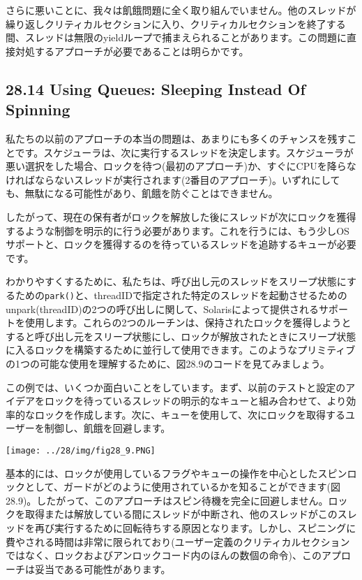 さらに悪いことに、我々は飢餓問題に全く取り組んでいません。他のスレッドが繰り返しクリティカルセクションに入り、クリティカルセクションを終了する間、スレッドは無限のyieldループで捕まえられることがあります。この問題に直接対処するアプローチが必要であることは明らかです。

\hypertarget{using-queues-sleeping-instead-of-spinning}{%
\subsection*{28.14 Using Queues: Sleeping Instead Of
Spinning}\label{using-queues-sleeping-instead-of-spinning}}

私たちの以前のアプローチの本当の問題は、あまりにも多くのチャンスを残すことです。スケジューラは、次に実行するスレッドを決定します。スケジューラが悪い選択をした場合、ロックを待つ(最初のアプローチ)か、すぐにCPUを降らなければならないスレッドが実行されます(2番目のアプローチ)。いずれにしても、無駄になる可能性があり、飢餓を防ぐことはできません。

したがって、現在の保有者がロックを解放した後にスレッドが次にロックを獲得するような制御を明示的に行う必要があります。これを行うには、もう少しOSサポートと、ロックを獲得するのを待っているスレッドを追跡するキューが必要です。

わかりやすくするために、私たちは、呼び出し元のスレッドをスリープ状態にするための\texttt{park()}と、threadIDで指定された特定のスレッドを起動させるためのunpark(threadID)の2つの呼び出しに関して、Solarisによって提供されるサポートを使用します。これらの2つのルーチンは、保持されたロックを獲得しようとすると呼び出し元をスリープ状態にし、ロックが解放されたときにスリープ状態に入るロックを構築するために並行して使用できます。このようなプリミティブの1つの可能な使用を理解するために、図28.9のコードを見てみましょう。

この例では、いくつか面白いことをしています。まず、以前のテストと設定のアイデアをロックを待っているスレッドの明示的なキューと組み合わせて、より効率的なロックを作成します。次に、キューを使用して、次にロックを取得するユーザーを制御し、飢餓を回避します。

\texttt{[image: ../28/img/fig28\_9.PNG]}

基本的には、ロックが使用しているフラグやキューの操作を中心としたスピンロックとして、ガードがどのように使用されているかを知ることができます(図28.9)。したがって、このアプローチはスピン待機を完全に回避しません。ロックを取得または解放している間にスレッドが中断され、他のスレッドがこのスレッドを再び実行するために回転待ちする原因となります。しかし、スピニングに費やされる時間は非常に限られており(ユーザー定義のクリティカルセクションではなく、ロックおよびアンロックコード内のほんの数個の命令)、このアプローチは妥当である可能性があります。

